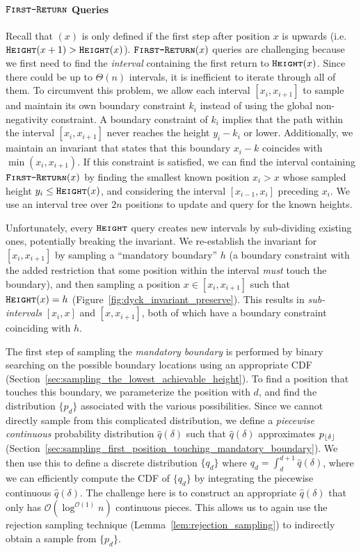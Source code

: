 \paragraph*{$\texttt{\textsc{First-Return}}$ Queries}
\label{par:_first-return_queries}
Recall that $(x)$ is only defined if the first step after position $x$ is upwards (i.e. $\texttt{\textsc{Height}}(x+1) > \texttt{\textsc{Height}}(x)$).
$\texttt{\textsc{First-Return}}(x)$ queries are challenging because we first need to find the \emph{interval} containing the first return to $\texttt{\textsc{Height}}(x)$.
Since there could be up to $\Theta(n)$ intervals, it is inefficient to iterate through all of them.
To circumvent this problem, we allow each interval $[x_i,x_{i+1}]$ to sample and maintain its own boundary constraint $k_i$
instead of using the global non-negativity constraint.
A boundary constraint of $k_i$ implies that the path within the interval $[x_i,x_{i+1}]$ never reaches the height $y_i-k_i$ or lower.
Additionally, we maintain an invariant that states that this boundary $x_i-k$ coincides with $\min(x_i,x_{i+1})$.
If this constraint is satisfied, we can find the interval containing $\texttt{\textsc{First-Return}}(x)$ by finding the smallest known position $x_i>x$
whose sampled height $y_i \le \texttt{\textsc{Height}}(x)$, and considering the interval $[x_{i-1},x_i]$ preceding $x_i$.
We use an interval tree over $2n$ positions to update and query for the known heights.

Unfortunately, every $\texttt{\textsc{Height}}$ query creates new intervals by sub-dividing existing ones, potentially breaking the invariant.
We re-establish the invariant for $[x_i,x_{i+1}]$ by sampling a ``mandatory boundary'' $h$
(a boundary constraint with the added restriction that some position within the interval \emph{must} touch the boundary),
and then sampling a position $x\in [x_i,x_{i+1}]$ such that $\texttt{\textsc{Height}}(x) = h$ (Figure~\ref{fig:dyck_invariant_preserve}).
This results in \emph{sub-intervals} $[x_i,x]$ and $[x,x_{i+1}]$, both of which have a boundary constraint coinciding with $h$.

The first step of sampling the \emph{mandatory boundary} is performed
by binary searching on the possible boundary locations using an appropriate CDF (Section~\ref{sec:sampling_the_lowest_achievable_height}).
To find a position that touches this boundary, we parameterize the position with $d$,
and find the distribution $\{p_d\}$ associated with the various possibilities.
Since we cannot directly sample from this complicated distribution, we define a \emph{piecewise continuous} probability distribution
$\hat q(\delta)$ such that $\hat q(\delta)$ approximates $p_{\lfloor\delta\rfloor}$ (Section~\ref{sec:sampling_first_position_touching_mandatory_boundary}).
We then use this to define a discrete distribution $\{q_d\}$ where $q_d = \int_d^{d+1}\hat q(\delta)$,
where we can efficiently compute the CDF of $\{q_d\}$ by integrating the piecewise continuous $\hat q(\delta)$.
The challenge here is to construct an appropriate $\hat q(\delta)$ that only has $\mathcal O(\log^{\mathcal O(1)} n)$ continuous pieces.
This allows us to again use the rejection sampling technique (Lemma~\ref{lem:rejection_sampling}) to indirectly obtain a sample from $\{p_d\}$.
